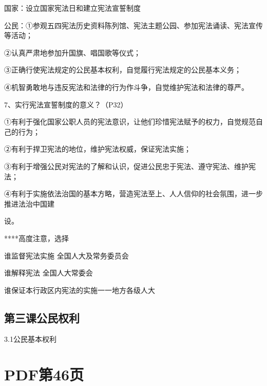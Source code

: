 \documentclass[lang=cn,11pt]{elegantbook}
\newcommand{\daofasym}[1]{{\daofasymbolfont #1}}
\newcommand{\daofasym}[1]{#1}
\begin{document}
国家：设立国家宪法日和建立宪法宣誓制度\par

公民：\daofasym{①}参观五四宪法历史资料陈列馆、宪法主题公园、参加宪法诵读、宪法宣传等活动；\par

\daofasym{②}认真严肃地参加升国旗、唱国歌等仪式；\par

\daofasym{③}正确行使宪法规定的公民基本权利，自觉履行宪法规定的公民基本义务；\par

\daofasym{④}机智勇敢地与违反宪法和法律的行为作斗争，自觉维护宪法和法律的尊严。\par

7、实行宪法宣誓制度的意义？（P32）\par

\daofasym{①}有利于强化国家公职人员的宪法意识，让他们珍惜宪法赋予的权力，自觉规范自己的行为；\par

\daofasym{②}有利于捍卫宪法的地位，维护宪法权威，保证宪法实施；\par

\daofasym{③}有利于增强公民对宪法的了解和认识，促进公民忠于宪法、遵守宪法、维护宪法；\par

\daofasym{④}有利于实施依法治国的基本方略，营造宪法至上、人人信仰的社会氛围，进一步推进法治中国建\par

设。\par

****高度注意，选择\par

谁监督宪法实施 全国人大及常务委员会\par

谁解释宪法 全国人大常委会\par

谁保证本行政区内宪法的实施一一地方各级人大\par

\subsection*{第三课公民权利}

3.1公民基本权利\par


\section*{PDF第46页}
\end{document}
